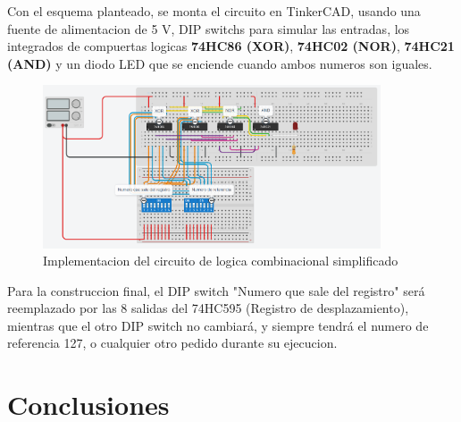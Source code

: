 \documentclass{article}
\begin{document}
Con el esquema planteado, se monta el circuito en TinkerCAD, usando una fuente de alimentacion de 5 V, DIP switchs para simular las entradas, los integrados de compuertas logicas \textbf{74HC86 (XOR)}, \textbf{74HC02 (NOR)}, \textbf{74HC21 (AND)} y un diodo LED que se enciende cuando ambos numeros son iguales.\\

\begin{figure}[!ht] 
\includegraphics[width=10cm]{montajeCompuertas.PNG}
\centering
\caption{Implementacion del circuito de logica combinacional simplificado}
\end{figure}

Para la construccion final, el DIP switch "Numero que sale del registro" será reemplazado por las 8 salidas del 74HC595 (Registro de desplazamiento), mientras que el otro DIP switch no cambiará, y siempre tendrá el numero de referencia 127, o cualquier otro pedido durante su ejecucion.

\section{Conclusiones} \label{conclusiones}



\end{document}
